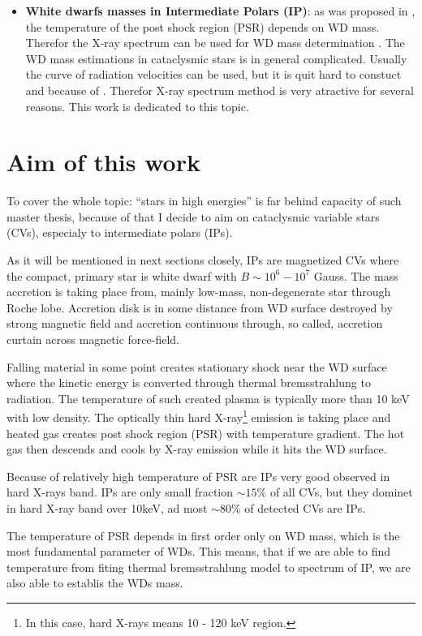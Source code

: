 \documentclass[oneside,a4paper,11pt]{report}
\begin{document}
\begin{itemize}
 \item \textbf{White dwarfs masses in Intermediate Polars (IP)}: as was proposed in \citet{1981ApJ...250..723R}, 
the temperature of the post shock region (PSR) depends on WD mass. Therefor the X-ray spectrum can be 
used for WD mass determination \citet{2005A&A...435..191S}. The WD mass estimations in cataclysmic stars 
is in general complicated. Usually the curve of radiation velocities can be used, but it is quit hard to constuct and
because of . 
Therefor X-ray spectrum method is very atractive for several reasons. This work is dedicated to this topic.  

\end{itemize}

\section{Aim of this work}
To cover the whole topic: ``stars in high energies'' is far behind capacity of such master thesis, because of that I decide 
to aim on cataclysmic variable stars (CVs), especialy to intermediate polars (IPs). 

As it will be mentioned in next sections closely, IPs are magnetized CVs where the compact, primary star 
is white dwarf with $B\sim 10^6 -10^7$ Gauss. The mass accretion is taking place from, mainly low-mass, non-degenerate star through Roche lobe.  
Accretion disk is in some distance from WD surface destroyed by strong magnetic field and 
accretion continuous through, so called, accretion curtain across magnetic force-field.

Falling material in some point creates stationary shock near the WD surface where the kinetic energy is converted 
through thermal bremsstrahlung to radiation. The temperature of such created plasma is typically more than 
10 keV with low density. The optically thin hard X-ray\footnote{In this case, hard X-rays means 10 - 120 keV region.} emission is taking place and heated gas creates 
post shock region (PSR) with temperature gradient. The hot gas then descends and cools by X-ray 
emission while it hits the WD surface.      

Because of relatively high temperature of PSR are IPs very good observed in hard X-rays band. 
IPs are only small fraction $\sim 15\%$ of all CVs, but they dominet in hard X-ray band over 10keV, ad most 
$\sim 80\%$ of detected CVs are IPs\citet{2009MNRAS.392..630L}. 

The temperature of PSR depends in first order only on WD mass, which is the most fundamental parameter of WDs.
This means, that if we are able to find temperature from fiting thermal bremsstrahlung model to spectrum of IP, 
we are also able to establis the WDs mass. 
\end{document}
